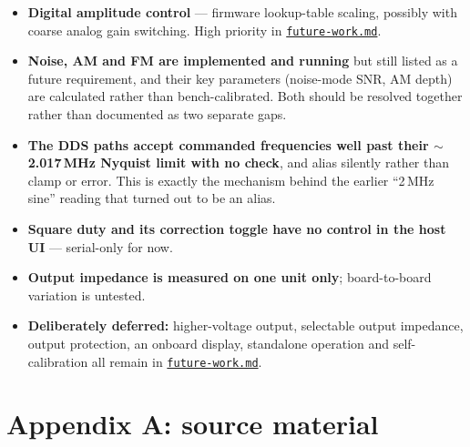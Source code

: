 \documentclass[11pt,a4paper]{article}
\newcommand{\doc}[1]{\href{https://github.com/Lambros25/Function-Generator/blob/main/docs/#1}{\texttt{#1}}}
\begin{document}
\begin{itemize}
    \item \textbf{Digital amplitude control} --- firmware lookup-table scaling, possibly with
          coarse analog gain switching. High priority in \doc{future-work.md}.
    \item \textbf{Noise, AM and FM are implemented and running} but still listed as a future
          requirement, and their key parameters (noise-mode SNR, AM depth) are calculated rather
          than bench-calibrated. Both should be resolved together rather than documented as two
          separate gaps.
    \item \textbf{The DDS paths accept commanded frequencies well past their
              $\sim$2.017\,MHz Nyquist limit with no check}, and alias silently rather than clamp or
          error. This is exactly the mechanism behind the earlier ``2\,MHz sine'' reading that
          turned out to be an alias.
    \item \textbf{Square duty and its correction toggle have no control in the host UI} ---
          serial-only for now.
    \item \textbf{Output impedance is measured on one unit only}; board-to-board variation is
          untested.
    \item \textbf{Deliberately deferred:} higher-voltage output, selectable output impedance,
          output protection, an onboard display, standalone operation and self-calibration all
          remain in \doc{future-work.md}.
\end{itemize}

\clearpage
\section*{Appendix A: source material}
\label{sec:appendix-sources}
\end{document}
